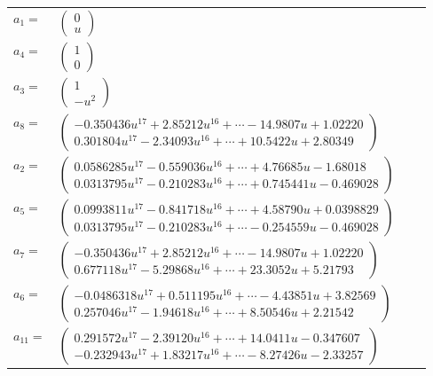 \documentclass[1p]{elsarticle_modified}
\theoremstyle{definition}
\begin{document}
\begin{tabular}{m{7pt} m{180pt} m{7pt} m{180pt} }
\flushright $a_{1}=$&$\begin{pmatrix}0\\u\end{pmatrix}$ \\
\flushright $a_{4}=$&$\begin{pmatrix}1\\0\end{pmatrix}$ \\
\flushright $a_{3}=$&$\begin{pmatrix}1\\- u^2\end{pmatrix}$ \\
\flushright $a_{8}=$&$\begin{pmatrix}-0.350436 u^{17}+2.85212 u^{16}+\cdots-14.9807 u+1.02220\\0.301804 u^{17}-2.34093 u^{16}+\cdots+10.5422 u+2.80349\end{pmatrix}$ \\
\flushright $a_{2}=$&$\begin{pmatrix}0.0586285 u^{17}-0.559036 u^{16}+\cdots+4.76685 u-1.68018\\0.0313795 u^{17}-0.210283 u^{16}+\cdots+0.745441 u-0.469028\end{pmatrix}$ \\
\flushright $a_{5}=$&$\begin{pmatrix}0.0993811 u^{17}-0.841718 u^{16}+\cdots+4.58790 u+0.0398829\\0.0313795 u^{17}-0.210283 u^{16}+\cdots-0.254559 u-0.469028\end{pmatrix}$ \\
\flushright $a_{7}=$&$\begin{pmatrix}-0.350436 u^{17}+2.85212 u^{16}+\cdots-14.9807 u+1.02220\\0.677118 u^{17}-5.29868 u^{16}+\cdots+23.3052 u+5.21793\end{pmatrix}$ \\
\flushright $a_{6}=$&$\begin{pmatrix}-0.0486318 u^{17}+0.511195 u^{16}+\cdots-4.43851 u+3.82569\\0.257046 u^{17}-1.94618 u^{16}+\cdots+8.50546 u+2.21542\end{pmatrix}$ \\
\flushright $a_{11}=$&$\begin{pmatrix}0.291572 u^{17}-2.39120 u^{16}+\cdots+14.0411 u-0.347607\\-0.232943 u^{17}+1.83217 u^{16}+\cdots-8.27426 u-2.33257\end{pmatrix}$ \\

\end{tabular}
\end{document}
